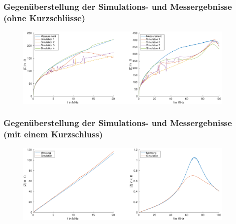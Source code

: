\documentclass[accentcolor=tud9b, colorbacktitle, inverttitle]{tudbeamer}
\begin{document}
% 



\begin{frame}\frametitle{Gegen\"uberstellung der Simulations- und Messergebnisse (ohne Kurzschl\"usse)}
\vspace{-1em}
\begin{figure}[h]
	\centering
	\includegraphics[width=0.95\textwidth]{Zges_RK_SimMeas}
\end{figure}
\end{frame}



\begin{frame}\frametitle{Gegen\"uberstellung der Simulations- und Messergebnisse (mit einem Kurzschluss)}
\vspace{-1em}
\begin{figure}[h]
	\centering
	\includegraphics[width=0.95\textwidth]{Z_ges_1KS_SimMeas}
\end{figure}
\end{frame}



\end{document}
